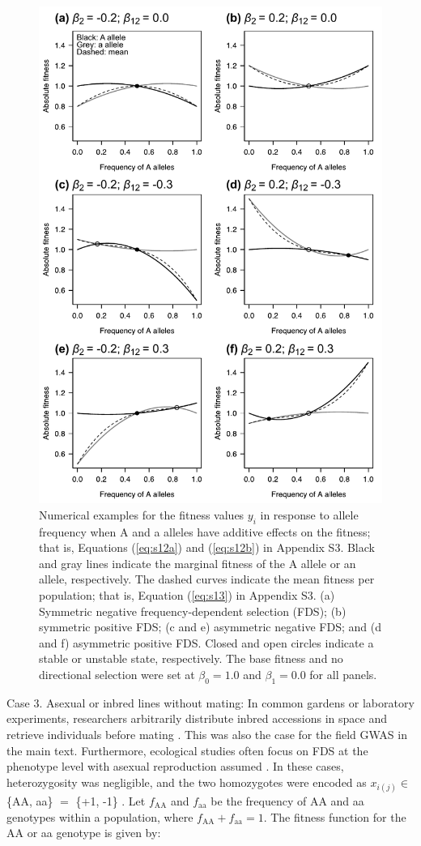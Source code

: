 \documentclass[12pt,]{article}
\begin{document}
\begin{figure}[]
  \includegraphics[width=0.75\linewidth]{AsymFDSadd.pdf}
  \caption{Numerical examples for the fitness values $y_i$ in response to allele frequency when A and a alleles have additive effects on the fitness; that is, Equations (\ref{eq:s12a}) and (\ref{eq:s12b}) in Appendix S3. Black and gray lines indicate the marginal fitness of the A allele or an allele, respectively. The dashed curves indicate the mean fitness per population; that is, Equation (\ref{eq:s13}) in Appendix S3. (a) Symmetric negative frequency-dependent selection (FDS); (b) symmetric positive FDS; (c and e) asymmetric negative FDS; and (d and f) asymmetric positive FDS. Closed and open circles indicate a stable or unstable state, respectively. The base fitness and no directional selection were set at $\beta_0=1.0$ and $\beta_1=0.0$ for all panels.}
  \label{figS2:FDSadd}
\end{figure}

Case 3. Asexual or inbred lines without mating: In common gardens or laboratory experiments, researchers arbitrarily distribute inbred accessions in space and retrieve individuals before mating \citep[e.g.,][]{schutz1969inter, sato2019neighbor}. This was also the case for the field GWAS in the main text. Furthermore, ecological studies often focus on FDS at the phenotype level with asexual reproduction assumed \citep[e.g.,][]{takahashi2018balanced}. In these cases, heterozygosity was negligible, and the two homozygotes were encoded as $x_{i(j)} \in $ \{AA, aa\} $=$ \{+1, -1\} \citep{sato2019neighbor}. Let $f_\mathrm{AA}$ and $f_\mathrm{aa}$ be the frequency of AA and aa genotypes within a population, where $f_\mathrm{AA} + f_\mathrm{aa} = 1$. The fitness function for the AA or aa genotype is given by:
\end{document}
